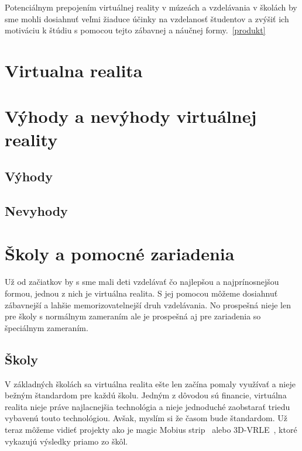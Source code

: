 \documentclass[10pt,twoside,slovak,a4paper]{article}
\begin{document}
Potenciálnym prepojením virtuálnej reality v múzeách a vzdelávania v školách by sme mohli dosiahnuť veľmi žiaduce účinky na vzdelanosť študentov a zvýšiť ich motiváciu k štúdiu s pomocou tejto zábavnej a náučnej formy.~\ref{produkt}

\section{Virtualna realita} \label{realita}

 

\begin{figure*}[tbh]

\end{figure*}



\section{Výhody a nevýhody virtuálnej reality} \label{procon}


\subsection{Výhody} \label{procon:vyhody}



\subsection{Nevyhody} \label{procon:nevyhody}


\section{Školy a pomocné zariadenia} \label{školy}
Už od začiatkov by s sme mali deti vzdelávať čo najlepšou a najprínosnejšou formou, jednou z nich je virtuálna realita. S jej pomocou môžeme dosiahnuť zábavnejší a lahšie memorizovatelnejší druh vzdelávania. No prospešná nieje len pre školy s normálnym zameraním ale je prospešná aj pre zariadenia so špeciálnym zameraním. 

\subsection{Školy} \label{školy:školy}
V základných školách sa virtuálna realita ešte len začína pomaly využívať a nieje bežným štandardom pre každú školu. Jedným z dôvodou sú financie, virtuálna realita nieje práve najlacnejšia technológia a nieje jednoduché zaobstarať triedu vybavenú touto technológiou. Avšak, myslím si že časom bude štandardom. Už teraz môžeme vidieť projekty ako je magic Mobius strip~\cite{Math} alebo 3D-VRLE~\cite{Physics}, ktoré vykazujú výsledky priamo zo škôl. 
\end{document}
